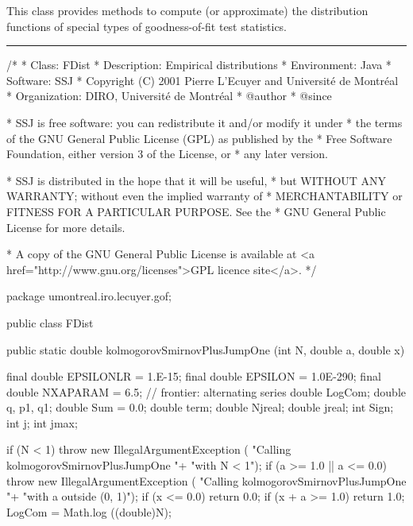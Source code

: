 
This class provides methods to compute (or approximate)
the distribution functions of special types of
goodness-of-fit test statistics.

\bigskip\hrule

\begin{code}
\begin{hide}
/*
 * Class:        FDist
 * Description:  Empirical distributions
 * Environment:  Java
 * Software:     SSJ 
 * Copyright (C) 2001  Pierre L'Ecuyer and Université de Montréal
 * Organization: DIRO, Université de Montréal
 * @author       
 * @since

 * SSJ is free software: you can redistribute it and/or modify it under
 * the terms of the GNU General Public License (GPL) as published by the
 * Free Software Foundation, either version 3 of the License, or
 * any later version.

 * SSJ is distributed in the hope that it will be useful,
 * but WITHOUT ANY WARRANTY; without even the implied warranty of
 * MERCHANTABILITY or FITNESS FOR A PARTICULAR PURPOSE.  See the
 * GNU General Public License for more details.

 * A copy of the GNU General Public License is available at
   <a href="http://www.gnu.org/licenses">GPL licence site</a>.
 */
\end{hide}
package umontreal.iro.lecuyer.gof;


public class FDist\begin{hide} {
   private FDist() {}
\end{hide}

   public static double kolmogorovSmirnovPlusJumpOne (int N, double a,
                                                      double x)\begin{hide} {
      final double EPSILONLR = 1.E-15;
      final double EPSILON = 1.0E-290;
      final double NXAPARAM = 6.5;   // frontier: alternating series
      double LogCom;
      double q, p1, q1;
      double Sum = 0.0;
      double term;
      double Njreal;
      double jreal;
      int Sign;
      int j;
      int jmax;

      if (N < 1)
        throw new IllegalArgumentException (
                             "Calling kolmogorovSmirnovPlusJumpOne "+
                             "with N < 1");
      if (a >= 1.0 || a <= 0.0)
        throw new IllegalArgumentException (
                             "Calling kolmogorovSmirnovPlusJumpOne "+
                             "with a outside (0, 1)");
      if (x <= 0.0)
         return 0.0;
      if (x + a >= 1.0)
         return 1.0;
      LogCom = Math.log ((double)N);

}
\end{hide}
\end{code}
